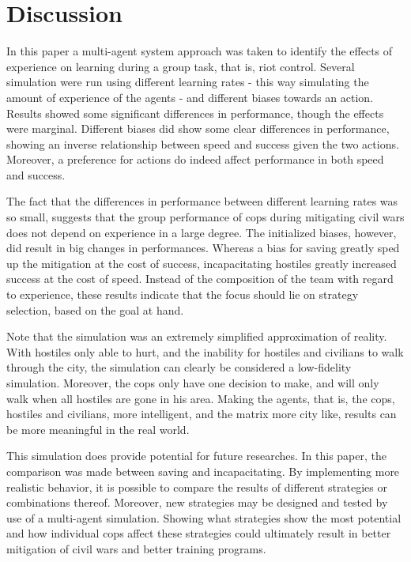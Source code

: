 \section{Discussion}
In this paper a multi-agent system approach was taken to identify the effects of experience on learning during a group task, that is, riot control. Several simulation were run using different learning rates - this way simulating the amount of experience of the agents - and different biases towards an action. Results showed some significant differences in performance, though the effects were marginal. Different biases did show some clear differences in performance, showing an inverse relationship between speed and success given the two actions. Moreover, a preference for actions do indeed affect performance in both speed and success. 

The fact that the differences in performance between different learning rates was so small, suggests that the group performance of cops during mitigating civil wars does not depend on experience in a large degree. The initialized biases, however, did result in big changes in performances. Whereas a bias for saving greatly sped up the mitigation at the cost of success, incapacitating hostiles greatly increased success at the cost of speed. Instead of the composition of the team with regard to experience, these results indicate that the focus should lie on strategy selection, based on the goal at hand. 

Note that the simulation was an extremely simplified approximation of reality. With hostiles only able to hurt, and the inability for hostiles and civilians to walk through the city, the simulation can clearly be considered a low-fidelity simulation. Moreover, the cops only have one decision to make, and will only walk when all hostiles are gone in his area. Making the agents, that is, the cops, hostiles and civilians, more intelligent, and the matrix more city like, results can be more meaningful in the real world. 

This simulation does provide potential for future researches. In this paper, the comparison was made between saving and incapacitating. By implementing more realistic behavior, it is possible to compare the results of different strategies or combinations thereof. Moreover, new strategies may be designed and tested by use of a multi-agent simulation. Showing what strategies show the most potential and how individual cops affect these strategies could ultimately result in better mitigation of civil wars and better training programs. 

